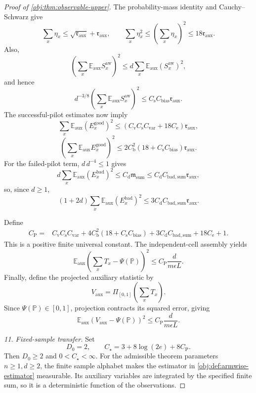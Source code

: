 \begin{proof}[Proof of \cref{obj:thm:observable-upper}]
The probability-mass identity and Cauchy--Schwarz give
\[
\sum_x\eta_x\le\sqrt{\mathfrak r_{\mathrm{aux}}}+\mathfrak r_{\mathrm{aux}},
\qquad
\sum_x\eta_x^2\le\left(\sum_x\eta_x\right)^2
\le18\mathfrak r_{\mathrm{aux}}.
\]
Also,
\[
\left(\sum_x\mathbb E_{\mathrm{aux}}S_x^{\mathrm{aw}}\right)^2
\le d\sum_x\mathbb E_{\mathrm{aux}}(S_x^{\mathrm{aw}})^2,
\]
and hence
\[
d^{-3/8}
\left(\sum_x\mathbb E_{\mathrm{aux}}S_x^{\mathrm{aw}}\right)^2
\le C_{\mathrm s}C_{\mathrm{bias}}\mathfrak r_{\mathrm{aux}}.
\]
The successful-pilot estimates now imply
\[
\sum_x\mathbb E_{\mathrm{aux}}(E_x^{\mathrm{good}})^2
\le
(C_{\mathrm v}C_{\mathrm s}C_{\mathrm{var}}+18C_{\mathrm e})
\mathfrak r_{\mathrm{aux}},
\]
\[
\left(\sum_x\mathbb E_{\mathrm{aux}}E_x^{\mathrm{good}}\right)^2
\le
2C_{\mathrm b}^2(18+C_{\mathrm s}C_{\mathrm{bias}})
\mathfrak r_{\mathrm{aux}}.
\]
For the failed-pilot term, \(d\,d^{-4}\le1\) gives
\[
d\sum_x\mathbb E_{\mathrm{aux}}(E_x^{\mathrm{bad}})^2
\le C_{\mathrm d}\mathfrak m_{\mathrm{sum}}
\le C_{\mathrm d}C_{\mathrm{bad,sum}}\mathfrak r_{\mathrm{aux}},
\]
so, since \(d\ge1\),
\[
(1+2d)\sum_x\mathbb E_{\mathrm{aux}}(E_x^{\mathrm{bad}})^2
\le3C_{\mathrm d}C_{\mathrm{bad,sum}}\mathfrak r_{\mathrm{aux}}.
\]

Define
\[
\begin{aligned}
C_{\mathrm P}={}&
C_{\mathrm v}C_{\mathrm s}C_{\mathrm{var}}
+4C_{\mathrm b}^2(18+C_{\mathrm s}C_{\mathrm{bias}})
+3C_{\mathrm d}C_{\mathrm{bad,sum}}
+18C_{\mathrm e}+1.
\end{aligned}
\]
This is a positive finite universal constant. The independent-cell assembly yields
\[
\mathbb E_{\mathrm{aux}}
\left(\sum_xT_x-\Psi(\mathbb P)\right)^2
\le C_{\mathrm P}\frac{d}{m\epsilon L}.
\]
Finally, define the projected auxiliary statistic by
\[
V_{\mathrm{aux}}=\Pi_{[0,1]}\left(\sum_xT_x\right).
\]
Since \(\Psi(\mathbb P)\in[0,1]\), projection contracts its squared error, giving
\[
\mathbb E_{\mathrm{aux}}
(V_{\mathrm{aux}}-\Psi(\mathbb P))^2
\le C_{\mathrm P}\frac{d}{m\epsilon L}.
\]

\textit{11. Fixed-sample transfer.}
Set
\[
D_0=2,\qquad
C_\star=3+8\log(2e)+8C_{\mathrm P}.
\]
Then \(D_0\ge2\) and \(0<C_\star<\infty\). For the admissible theorem parameters \(n\ge1,d\ge2\), the finite sample alphabet makes the estimator in \cref{obj:def:armwise-estimator} measurable. Its auxiliary variables are integrated by the specified finite sum, so it is a deterministic function of the observations.


\end{proof}
